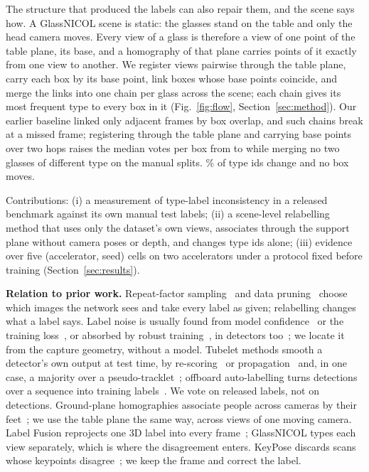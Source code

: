 \documentclass{article}
\begin{document}
The structure that produced the labels can also repair them, and the scene says how. A GlassNICOL scene is static: the glasses stand on the table and only the head camera moves. Every view of a glass is therefore a view of one point of the table plane, its base, and a homography of that plane carries points of it exactly from one view to another. We register views pairwise through the table plane, carry each box by its base point, link boxes whose base points coincide, and merge the links into one chain per glass across the scene; each chain gives its most frequent type to every box in it (Fig.~\ref{fig:flow}, Section~\ref{sec:method}). Our earlier baseline linked only adjacent frames by box overlap, and such chains break at a missed frame; registering through the table plane and carrying base points over two hops raises the median votes per box from \TrkMedianVotes{} to \SceneMedianLen{} while merging no two glasses of different type on the manual splits. \SceneChangedPct\% of type ids change and no box moves.

Contributions: (i) a measurement of type-label inconsistency in a released benchmark against its own manual test labels; (ii) a scene-level relabelling method that uses only the dataset's own views, associates through the support plane without camera poses or depth, and changes type ids alone; (iii) evidence over five (accelerator, seed) cells on two accelerators under a protocol fixed before training (Section~\ref{sec:results}).

\noindent\textbf{Relation to prior work.} Repeat-factor sampling~\cite{gupta2019lvis} and data pruning~\cite{paul2021datadiet,sorscher2022pruning} choose which images the network sees and take every label as given; relabelling changes what a label says. Label noise is usually found from model confidence~\cite{northcutt2021confident,northcutt2021errors} or the training loss~\cite{schubert2024labelerrors}, or absorbed by robust training~\cite{song2023noisysurvey}, in detectors too~\cite{liu2022nlte}; we locate it from the capture geometry, without a model. Tubelet methods smooth a detector's own output at test time, by re-scoring~\cite{kang2016tcnn,han2016seqnms} or propagation~\cite{tripathi2016propagation} and, in one case, a majority over a pseudo-tracklet~\cite{chen2016pseudotracklet}; offboard auto-labelling turns detections over a sequence into training labels~\cite{qi2021offboard}. We vote on released labels, not on detections. Ground-plane homographies associate people across cameras by their feet~\cite{khan2006homography}; we use the table plane the same way, across views of one moving camera. Label Fusion reprojects one 3D label into every frame~\cite{marion2018labelfusion}; GlassNICOL types each view separately, which is where the disagreement enters. KeyPose discards scans whose keypoints disagree~\cite{liu2020keypose}; we keep the frame and correct the label.
\end{document}

